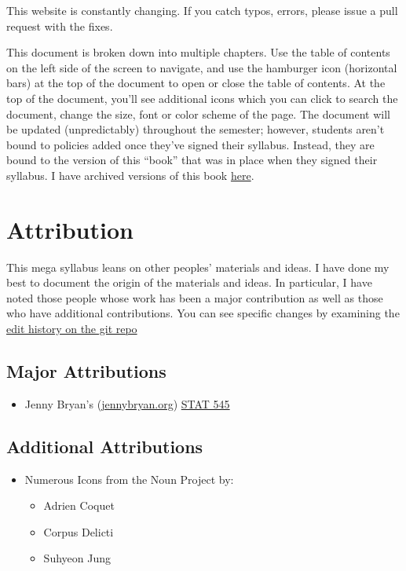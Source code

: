 This website is constantly changing. If you catch typos, errors, please issue a pull request with the fixes.

This document is broken down into multiple chapters. Use the table of contents on the left side of the screen to navigate, and use the hamburger icon (horizontal bars) at the top of the document to open or close the table of contents. At the top of the document, you'll see additional icons which you can click to search the document, change the size, font or color scheme of the page. The document will be updated (unpredictably) throughout the semester; however, students aren't bound to policies added once they've signed their syllabus. Instead, they are bound to the version of this ``book'' that was in place when they signed their syllabus. I have archived versions of this book \href{https://github.com/smasongarrison/syllabi/blob/main/docs/megasyllabus.pdf}{here}.

\hypertarget{attribution}{%
\chapter*{Attribution}\label{attribution}}


This mega syllabus leans on other peoples' materials and ideas. I have done my best to document the origin of the materials and ideas. In particular, I have noted those people whose work has been a major contribution as well as those who have additional contributions. You can see specific changes by examining the \href{https://github.com/smasongarrison/Syllabi/commits/main}{edit history on the git repo}

\hypertarget{major-attributions}{%
\section*{Major Attributions}\label{major-attributions}}


\begin{itemize}
\tightlist
\item
  Jenny Bryan's (\href{https://jennybryan.org}{jennybryan.org}) \href{https://stat545.com}{STAT 545}
\end{itemize}

\hypertarget{additional-attributions}{%
\section*{Additional Attributions}\label{additional-attributions}}


\begin{itemize}
\tightlist
\item
  Numerous Icons from the Noun Project by:

  \begin{itemize}
  \tightlist
  \item
    Adrien Coquet
  \item
    Corpus Delicti
  \item
    Suhyeon Jung
  \end{itemize}
\end{itemize}

